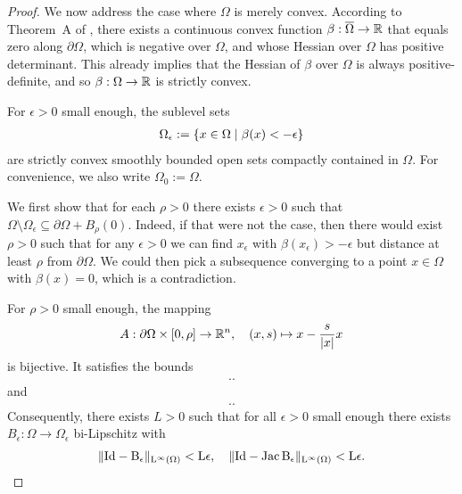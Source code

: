 \documentclass[12pt,a4paper]{article}
\begin{document}
\begin{proof}
    We now address the case where $\Omega$ is merely convex. 
    According to Theorem~A of \cite{blocki1997smooth}, 
    there exists a continuous convex function $\beta : \overline\Omega \rightarrow {\mathbb R}$ that equals zero along $\partial\Omega$, which is negative over $\Omega$, and whose Hessian over $\Omega$ has positive determinant. 
    This already implies that the Hessian of $\beta$ over $\Omega$ is always positive-definite, and so $\beta : \Omega \rightarrow {\mathbb R}$ is strictly convex.
    
    For $\epsilon > 0$ small enough, the sublevel sets 
    \begin{align*}
        \Omega_{\epsilon} := \left\{ x \in \Omega \suchthat \beta(x) < -\epsilon \right\}
    \end{align*}
    are strictly convex smoothly bounded open sets compactly contained in $\Omega$. 
    For convenience, we also write $\Omega_{0} := \Omega$. 
    
    We first show that for each $\rho > 0$ there exists $\epsilon > 0$ such that $\Omega \setminus \Omega_{\epsilon} \subseteq \partial\Omega + B_{\rho}(0)$. 
    Indeed, if that were not the case, then there would exist $\rho > 0$ such that for any $\epsilon > 0$ we can find $x_{\epsilon}$ with $\beta(x_{\epsilon}) > -\epsilon$ but distance at least $\rho$ from $\partial\Omega$. We could then pick a subsequence converging to a point $x \in \Omega$ with $\beta(x) = 0$, which is a contradiction. 
    
    For $\rho > 0$ small enough, the mapping 
    \begin{align*}
        A : \partial\Omega \times [0,\rho] \rightarrow {\mathbb R}^{n}, \quad (x,s) \mapsto x - \frac{s}{|x|} x
    \end{align*}
    is bijective. It satisfies the bounds 
    \begin{align*}
        ..
    \end{align*}
    and 
    \begin{align*}
        ..
    \end{align*}
    Consequently, there exists $L > 0$ such that for all $\epsilon > 0$ small enough 
    there exists $B_{\epsilon} : \Omega \rightarrow \Omega_{\epsilon}$ bi-Lipschitz with
    \begin{align*}
        \| \rm{Id} - B_{\epsilon} \|_{L^{\infty}(\Omega)} < L \epsilon,
        \quad 
        \| \rm{Id} - \operatorname{{\rm Jac}} B_{\epsilon} \|_{L^{\infty}(\Omega)} < L \epsilon.
    \end{align*}
    

\end{proof}
\end{document}
